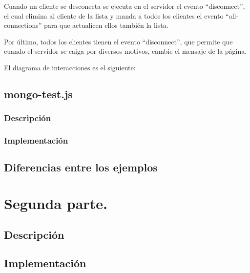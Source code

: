 \documentclass{article}
\begin{document}
Cuando un cliente se desconecta se ejecuta en el servidor el evento ``disconnect'', el cual elimina al cliente de la lista y manda a todos los clientes el evento ``all-connections'' para que actualicen ellos también la lista.

Por último, todos los clientes tienen el evento ``disconnect'', que permite que cuando el servidor se caiga por diversos motivos, cambie el mensaje de la página.


El diagrama de interacciones es el siguiente:

\subsection{mongo-test.js}
\subsubsection{Descripción}
\subsubsection{Implementación}

\subsection{Diferencias entre los ejemplos}

\section{Segunda parte.}
\subsection{Descripción}
\subsection{Implementación}
\end{document}
